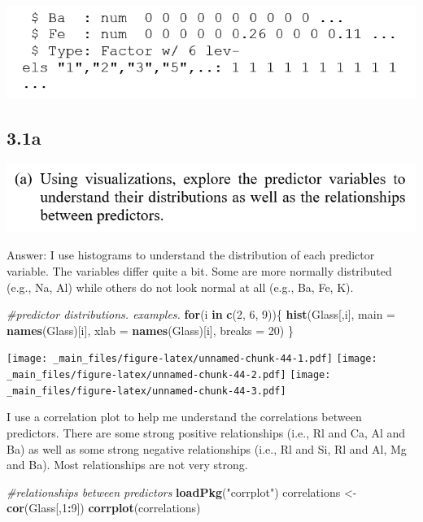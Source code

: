 \documentclass[]{book}
\newenvironment{Shaded}{\begin{snugshade}}{\end{snugshade}}
\newcommand{\CommentTok}[1]{\textcolor[rgb]{0.56,0.35,0.01}{\textit{#1}}}
\newcommand{\ControlFlowTok}[1]{\textcolor[rgb]{0.13,0.29,0.53}{\textbf{#1}}}
\newcommand{\DataTypeTok}[1]{\textcolor[rgb]{0.13,0.29,0.53}{#1}}
\newcommand{\DecValTok}[1]{\textcolor[rgb]{0.00,0.00,0.81}{#1}}
\newcommand{\KeywordTok}[1]{\textcolor[rgb]{0.13,0.29,0.53}{\textbf{#1}}}
\newcommand{\NormalTok}[1]{#1}
\newcommand{\OperatorTok}[1]{\textcolor[rgb]{0.81,0.36,0.00}{\textbf{#1}}}
\newcommand{\StringTok}[1]{\textcolor[rgb]{0.31,0.60,0.02}{#1}}
\begin{document}
\includegraphics{./week3/3.1cont.png}

\hypertarget{a-4}{%
\subsection{3.1a}\label{a-4}}

\includegraphics{./week3/3.1a.png}

Answer:
I use histograms to understand the distribution of each predictor variable. The variables differ quite a bit. Some are more normally distributed (e.g., Na, Al) while others do not look normal at all (e.g., Ba, Fe, K).

\begin{Shaded}
\begin{Highlighting}[]
\CommentTok{#predictor distributions.  examples.}
\ControlFlowTok{for}\NormalTok{(i }\ControlFlowTok{in} \KeywordTok{c}\NormalTok{(}\DecValTok{2}\NormalTok{, }\DecValTok{6}\NormalTok{, }\DecValTok{9}\NormalTok{))\{}
  \KeywordTok{hist}\NormalTok{(Glass[,i], }\DataTypeTok{main =} \KeywordTok{names}\NormalTok{(Glass)[i], }\DataTypeTok{xlab =} \KeywordTok{names}\NormalTok{(Glass)[i], }\DataTypeTok{breaks =} \DecValTok{20}\NormalTok{)}
\NormalTok{\}}
\end{Highlighting}
\end{Shaded}

\texttt{[image: \_main\_files/figure-latex/unnamed-chunk-44-1.pdf]} \texttt{[image: \_main\_files/figure-latex/unnamed-chunk-44-2.pdf]} \texttt{[image: \_main\_files/figure-latex/unnamed-chunk-44-3.pdf]}

I use a correlation plot to help me understand the correlations between predictors. There are some strong positive relationships (i.e., Rl and Ca, Al and Ba) as well as some strong negative relationships (i.e., Rl and Si, Rl and Al, Mg and Ba). Most relationships are not very strong.

\begin{Shaded}
\begin{Highlighting}[]
\CommentTok{#relationships between predictors}
\KeywordTok{loadPkg}\NormalTok{(}\StringTok{"corrplot"}\NormalTok{)}
\NormalTok{correlations <-}\StringTok{ }\KeywordTok{cor}\NormalTok{(Glass[,}\DecValTok{1}\OperatorTok{:}\DecValTok{9}\NormalTok{])}
\KeywordTok{corrplot}\NormalTok{(correlations)}
\end{Highlighting}
\end{Shaded}
\end{document}
